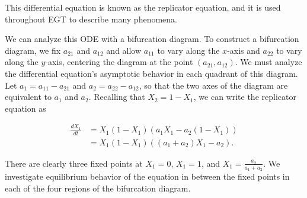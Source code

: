 \documentclass[notitlepage,reqno]{amsart}
\begin{document}
This differential equation is known as the replicator equation, and it
is used throughout EGT to describe many phenomena. 

We can analyze this ODE with a bifurcation diagram. To construct a
bifurcation diagram, we fix $a_{21}$ and $a_{12}$ and allow $a_{11}$
to vary along the $x$-axis and $a_{22}$ to vary along the
$y$-axis, centering the diagram at the point $(a_{21},a_{12})$. We must analyze
the differential equation's asymptotic behavior in each quadrant of
this diagram. Let $a_1 = a_{11}-a_{21}$ and $a_2 = a_{22}-a_{12}$, so
that the two axes of the diagram are equivalent to $a_1$ and $a_2$. Recalling that
$X_2 = 1-X_1$, we can write the replicator equation as

\begin{align*}
    \frac{dX_1}{dt} &= X_1(1-X_1)\left(a_1X_1 - a_2(1-X_1)\right) \\
    &= X_1(1-X_1)\left( (a_1+a_2)X_1 - a_2 \right).
\end{align*}

There are clearly three fixed points at $X_1=0$, $X_1=1$, and
$X_1=\frac{a_2}{a_1+a_2}$. We investigate equilibrium behavior of the
equation in between the fixed points in each of the four regions of the bifurcation diagram.
\end{document}
